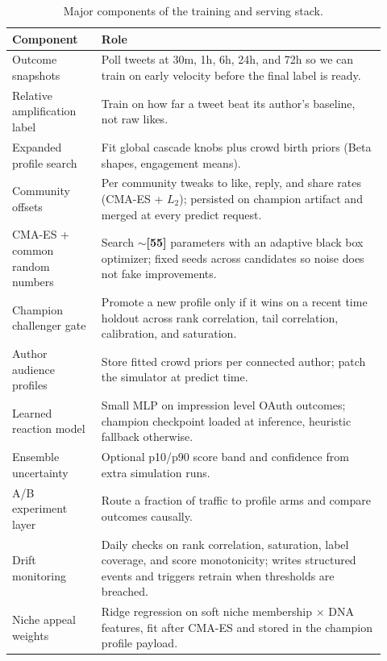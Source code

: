 \documentclass[11pt]{article}
\newcommand{\fill}[1]{\textbf{[#1]}}
\begin{document}
\begin{table}[t]
\centering
\caption{Major components of the training and serving stack.}
\label{tab:components}
\small
\begin{tabular}{p{0.22\linewidth}p{0.70\linewidth}}
\toprule
Component & Role \\
\midrule
Outcome snapshots &
Poll tweets at 30m, 1h, 6h, 24h, and 72h so we can train on early velocity
before the final label is ready. \\
Relative amplification label &
Train on how far a tweet beat its author's baseline, not raw likes. \\
Expanded profile search &
Fit global cascade knobs plus crowd birth priors (Beta shapes, engagement
means). \\
Community offsets &
Per community tweaks to like, reply, and share rates (CMA-ES + $L_2$);
persisted on champion artifact and merged at every predict request. \\
CMA-ES + common random numbers &
Search $\sim$\fill{55} parameters with an adaptive black box optimizer; fixed
seeds across candidates so noise does not fake improvements. \\
Champion challenger gate &
Promote a new profile only if it wins on a recent time holdout across rank
correlation, tail correlation, calibration, and saturation. \\
Author audience profiles &
Store fitted crowd priors per connected author; patch the simulator at predict
time. \\
Learned reaction model &
Small MLP on impression level OAuth outcomes; champion checkpoint loaded at
inference, heuristic fallback otherwise. \\
Ensemble uncertainty &
Optional p10/p90 score band and confidence from extra simulation runs. \\
A/B experiment layer &
Route a fraction of traffic to profile arms and compare outcomes causally. \\
Drift monitoring &
Daily checks on rank correlation, saturation, label coverage, and score
monotonicity; writes structured events and triggers retrain when thresholds
are breached. \\
Niche appeal weights &
Ridge regression on soft niche membership $\times$ DNA features, fit after
CMA-ES and stored in the champion profile payload. \\
\bottomrule
\end{tabular}
\end{table}
\end{document}
